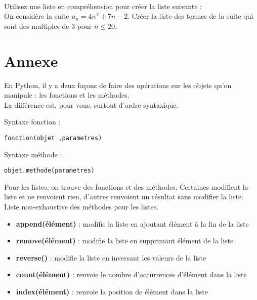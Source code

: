 \begin{exercice}~\\
Utilisez une liste en compr\' ehension pour cr\' eer la liste suivante :\\
On consid\` ere la suite $u_n=4n^2+7n-2$. Cr\' eer la liste des termes de la suite qui sont des multiples de 3 pour $n\leq 20$.
\end{exercice}



\newpage

\section*{Annexe}


\noindent En Python, il y a deux fa\c cons de faire des op\' erations sur les objets qu'on manipule : les fonctions et les m\' ethodes.\\
La diff\' erence est, pour vous, surtout d'ordre syntaxique.\\
\begin{center}
\begin{minipage}{7cm}
Syntaxe fonction :
\begin{verbatim}
fonction(objet ,parametres)
\end{verbatim}
\end{minipage}
\begin{minipage}{7cm}
Syntaxe m\' ethode :
\begin{verbatim}
objet.methode(parametres)
\end{verbatim}
\end{minipage}
\bigskip 
\end{center}
Pour les listes, on trouve des fonctions et des m\' ethodes. Certaines modifient la liste et ne renvoient rien, d'autres renvoient un r\' esultat sans modifier la liste.\bigskip \\
Liste non-exhaustive des m\' ethodes pour les listes. 
\begin{itemize}
\item \textbf{append(\' el\' ement)} : modifie la liste en ajoutant \' el\' ement \` a la fin de la liste
\item \textbf{remove(\' el\' ement)} : modifie la liste en supprimant \' el\' ement de la liste
\item \textbf{reverse()} : modifie la liste en inversant les valeurs de la liste
\item \textbf{count(\' el\' ement)} : renvoie le nombre d'occurrences d'\' el\' ement dans la liste
\item \textbf{index(\' el\' ement)} : renvoie la position de \' el\' ement dans la liste
\bigskip 
\end{itemize}
